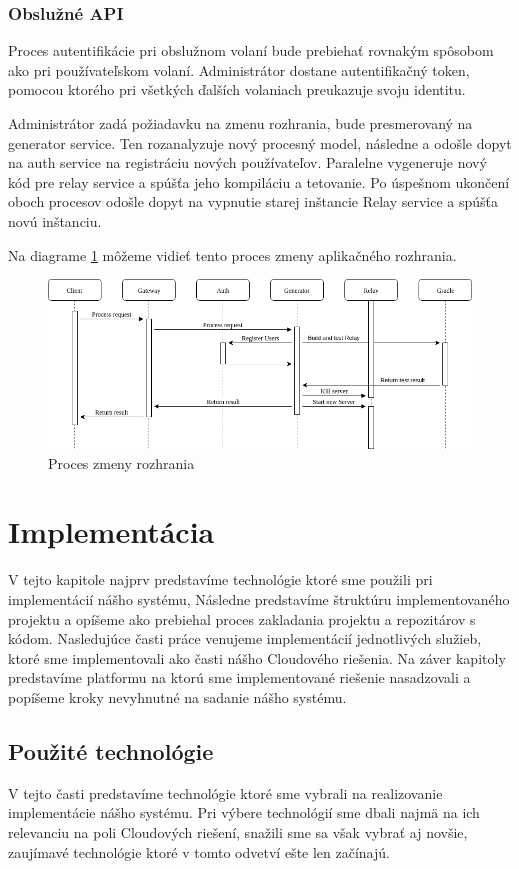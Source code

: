 \subsubsection{Obslužné API}
Proces autentifikácie pri obslužnom volaní bude prebiehať rovnakým spôsobom ako pri  používateľskom volaní. Administrátor dostane autentifikačný token, pomocou ktorého pri všetkých ďalších volaniach preukazuje svoju identitu.

Administrátor zadá požiadavku na zmenu rozhrania, bude presmerovaný na generator service. Ten rozanalyzuje nový procesný model, následne a odošle dopyt na auth service na registráciu nových používateľov. Paralelne vygeneruje nový kód pre relay service a spúšťa jeho kompiláciu a tetovanie. Po úspešnom ukončení oboch procesov odošle dopyt na vypnutie starej inštancie Relay service a spúšťa novú inštanciu.

Na diagrame \ref{change_operation} môžeme vidieť tento proces zmeny aplikačného rozhrania.

\begin{figure}[!htbp]
	\centering
	\includegraphics[width=14cm]{img/api_operation_change.png}
	\caption{Proces zmeny rozhrania}
	\label{change_operation}
\end{figure}


\section{Implementácia}
V tejto kapitole najprv predstavíme technológie ktoré sme použili pri implementácií nášho systému, Následne predstavíme štruktúru implementovaného projektu a opíšeme ako prebiehal proces zakladania projektu a repozitárov s kódom. 
Nasledujúce časti práce venujeme implementácií jednotlivých služieb, ktoré sme implementovali ako časti nášho Cloudového riešenia.
Na záver kapitoly predstavíme  platformu na ktorú sme implementované riešenie nasadzovali a popíšeme kroky nevyhnutné na sadanie nášho systému.  

\subsection{Použité technológie}
V tejto časti predstavíme technológie ktoré sme vybrali na realizovanie implementácie nášho systému. Pri výbere technológií sme dbali najmä na ich relevanciu na poli Cloudových riešení, snažili sme sa však vybrať aj novšie, zaujímavé technológie ktoré v tomto odvetví ešte len začínajú. 

